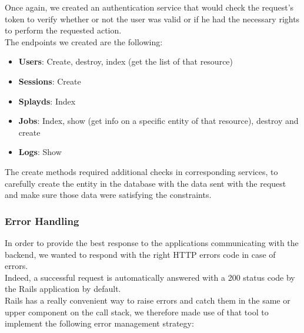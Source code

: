 \documentclass{eplmastersthesis}
\begin{document}
          Once again, we created an authentication service that would check
          the request's token to verify whether or not the user was valid or
          if he had the necessary rights to perform the requested action.\\

          The endpoints we created are the following:

          \begin{itemize}
            \item \textbf{Users}: Create, destroy, index (get the list of that
            resource)
            \item \textbf{Sessions}: Create
            \item \textbf{Splayds}: Index
            \item \textbf{Jobs}: Index, show (get info on a specific entity
            of that resource), destroy and create
            \item \textbf{Logs}: Show
          \end{itemize}

          The create methods required additional checks in corresponding
          services, to carefully create the entity in the database with
          the data sent with the request and make sure those data were
          satisfying the constraints.\\

        \subsubsection{Error Handling}

          In order to provide the best response to the applications
          communicating with the backend, we wanted to respond with
          the right HTTP errors code in case of errors.\\

          Indeed, a successful request is automatically answered with a 200
          status code by the Rails application by default.\\
          Rails has a really convenient way to raise errors and catch them
          in the same or upper component on the call stack, we therefore
          made use of that tool to implement the following error management
          strategy:
\end{document}
